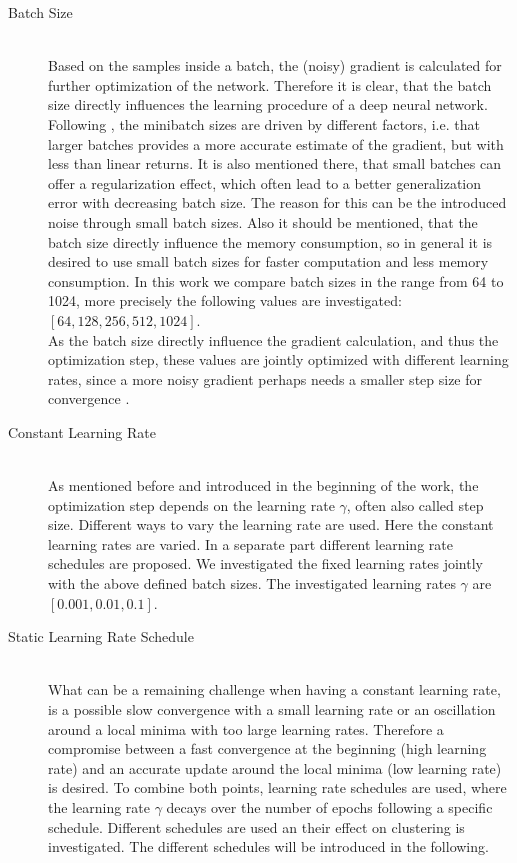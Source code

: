 \documentclass[12pt,DIV14,BCOR12mm,a4paper,footexclude,headinclude,halfparskip-,twoside,openright,openany,cleardoubleempty,idxtotoc,bibtotoc]{scrreprt} %
\numberwithin{equation}{chapter}
\begin{document}
\begin{description}
	\item[Batch Size]\hfill \\
	Based on the samples inside a batch, the (noisy) gradient is calculated for further optimization of the network. Therefore it is clear, that the batch size directly influences the learning procedure of a deep neural network. Following \cite{Goodfellow-et-al-2016}, the minibatch sizes are driven by  different factors, i.e. that larger batches provides a more accurate estimate of the gradient, but with less than linear returns. It is also mentioned there, that small batches can offer a regularization effect, which often lead to a better generalization error with decreasing batch size. The reason for this can be the introduced noise through small batch sizes. Also it should be mentioned, that the batch size directly influence the memory consumption, so in general it is desired to use small batch sizes for faster computation and less memory consumption. In this work we compare batch sizes in the range from 64 to 1024, more precisely the following values are investigated: $[64, 128, 256, 512, 1024]$.\\ As the batch size directly influence the gradient calculation, and thus the optimization step, these values are jointly optimized with different learning rates, since a more noisy gradient perhaps needs a smaller step size for convergence \cite{Goodfellow-et-al-2016}.
	\item[Constant Learning Rate]\hfill \\
	As mentioned before and introduced in the beginning of the work, the optimization step depends on the learning rate $\gamma$, often also called step size. Different ways to vary the learning rate are used. Here the constant learning rates are varied. In a separate part different learning rate schedules are proposed. We investigated the fixed learning rates jointly with the above defined batch sizes. The investigated learning rates $\gamma$ are $[0.001, 0.01, 0.1]$.
	\item[Static Learning Rate Schedule]\hfill \\
	What can be a remaining challenge when having a constant learning rate, is a possible slow convergence with a small learning rate or an oscillation around a local minima with too large learning rates. Therefore a compromise between a fast convergence at the beginning (high learning rate) and an accurate update around the local minima (low learning rate) is desired. To combine both points, learning rate schedules are used, where the learning rate $\gamma$ decays over the number of epochs following a specific schedule. Different schedules are used an their effect on clustering is investigated. The different schedules will be introduced in the following.

\end{description}
\end{document}
